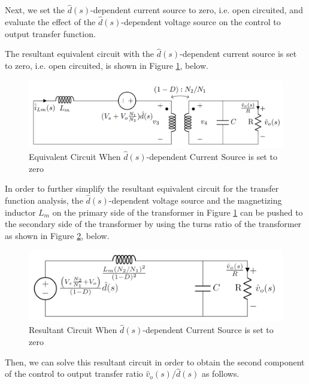 Next, we set the $\hat{d}(s)$-dependent current source to zero, i.e. open circuited, and evaluate the effect of the $\hat{d}(s)$-dependent voltage source on the control to output transfer function.

The resultant equivalent circuit with the  $\hat{d}(s)$-dependent current source is set to zero, i.e. open circuited, is shown in Figure \ref{com:fly_tf3}, below.

\begin{figure}[H]
\begin{center}
\includegraphics[width=1\textwidth]{Compensator/flyback_tf3.png}
\caption{Equivalent Circuit When $\hat{d}(s)$-dependent Current Source is set to zero}
\label{com:fly_tf3}
\end{center}
\end{figure}

In order to further simplify the resultant equivalent circuit for the transfer function analysis, the $\hat{d}(s)$-dependent voltage source and the magnetizing inductor $L_m$ on the primary side of the transformer in Figure \ref{com:fly_tf3} can be pushed to the secondary side of the transformer by using the turns ratio of the transformer as shown in Figure \ref{com:tf3}, below.

\begin{figure}[H]
\begin{center}
\includegraphics[width=1\textwidth]{Compensator/tf3.png}
\caption{Resultant Circuit When $\hat{d}(s)$-dependent Current Source is set to zero}
\label{com:tf3}
\end{center}
\end{figure}

Then, we can solve this resultant circuit in order to obtain the second component of the control to output transfer ratio $\hat{v}_o(s)/\hat{d}(s)$ as follows.

